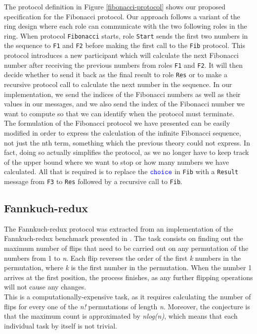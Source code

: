 \documentclass[12pt,twoside]{report}
\begin{document}
The protocol definition in Figure \ref{fibonacci-protocol} shows our proposed specification for the Fibonacci protocol. Our approach follows a variant of the ring design where each role can communicate with the two following roles in the ring. When protocol \texttt{Fibonacci} starts, role \texttt{Start} sends the first two numbers in the sequence to \texttt{F1} and \texttt{F2} before making the first call to the \texttt{Fib} protocol. This protocol introduces a new participant which will calculate the next Fibonacci number after receiving the previous numbers from roles \texttt{F1} and \texttt{F2}. It will then decide whether to send it back as the final result to role \texttt{Res} or to make a recursive protocol call to calculate the next number in the sequence. In our implementation, we send the indices of the Fibonacci numbers as well as their values in our messages, and we also send the index of the Fibonacci number we want to compute so that we can identify when the protocol must terminate.\\

The formulation of the Fibonacci protocol we have presented can be easily modified in order to express the calculation of the infinite Fibonacci sequence, not just the nth term, something which the previous theory could not express. In fact, doing so actually simplifies the protocol, as we no longer have to keep track of the upper bound where we want to stop or how many numbers we have calculated. All that is required is to replace the ${\color{blue}\mathtt{choice}}$ in \texttt{Fib} with a \texttt{Result} message from \texttt{F3} to \texttt{Res} followed by a recursive call to \texttt{Fib}.

\subsection{Fannkuch-redux}\label{fannkuch}

The Fannkuch-redux protocol was extracted from an implementation of the Fannkuch-redux benchmark presented in \cite{CLBG}. The task consists on finding out the maximum number of flips that need to be carried out on any permutation of the numbers from 1 to \textit{n}. Each flip reverses the order of the first \textit{k} numbers in the permutation, where \textit{k} is the first number in the permutation. When the number 1 arrives at the first position, the process finishes, as any further flipping operations will not cause any changes.\\

This is a computationally-expensive task, as it requires calculating the number of flips for every one of the \textit{n!} permutations of length \textit{n}. Moreover, the conjecture is that the maximum count is approximated by \textit{nlog(n)}, which means that each individual task by itself is not trivial.\\
\end{document}
